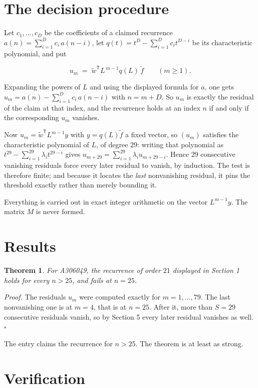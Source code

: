 \documentclass[11pt]{article}
\newtheorem{theorem}{Theorem}
\theoremstyle{definition}
\begin{document}
\section{The decision procedure}

Let $c_1,\dots,c_D$ be the coefficients of a claimed recurrence $a(n) = \sum_{i=1}^{D} c_i\,a(n-i)$, let $q(t) = t^{D} - \sum_{i=1}^{D} c_i t^{D-i}$ be its characteristic polynomial, and put

\[u_m \;=\; \tilde w^{\mathsf T} L^{\,m-1} q(L)\,\tilde f \qquad (m \ge 1).\]

Expanding the powers of $L$ and using the displayed formula for $a$, one gets $u_m = a(n) - \sum_{i=1}^{D} c_i\,a(n-i)$ with $n = m + D$. So $u_m$ is exactly the residual of the claim at that index, and the recurrence holds at an index $n$ if and only if the corresponding $u_m$ vanishes.

Now $u_m = \tilde w^{\mathsf T} L^{m-1} y$ with $y = q(L)\tilde f$ a fixed vector, so $(u_m)$ satisfies the characteristic polynomial of $L$, of degree $29$: writing that polynomial as $t^{29} - \sum_{i=1}^{29} \lambda_i t^{29-i}$ gives $u_{m+29} = \sum_{i=1}^{29} \lambda_i u_{m+29-i}$. Hence $29$ consecutive vanishing residuals force every later residual to vanish, by induction. The test is therefore finite; and because it locates the {\itshape last} nonvanishing residual, it pins the threshold exactly rather than merely bounding it.

Everything is carried out in exact integer arithmetic on the vector $L^{m-1}y$. The matrix $M$ is never formed.

\section{Results}

\begin{theorem} For A306049, the recurrence of order $21$ displayed in Section 1 holds for every $n > 25$, and fails at $n = 25$.\end{theorem}

{\itshape Proof.} The residuals $u_m$ were computed exactly for $m = 1,\dots,79$. The last nonvanishing one is at $m = 4$, that is at $n = 25$. After it, more than $S = 29$ consecutive residuals vanish, so by Section 5 every later residual vanishes as well. $\square$

The entry claims the recurrence for $n > 25$. The theorem is at least as strong.

\section{Verification}
\end{document}
